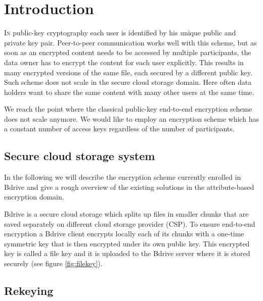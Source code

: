\section{Introduction}
\label{sec:introduction}
\lettrine[nindent=0em,lines=3]{I}n public-key cryptography each user is identified by his unique public and private key pair. Peer-to-peer communication works well with this scheme, but as soon as an encrypted content needs to be accessed by multiple participants, the data owner has to encrypt the content for each user explicitly. This results in many encrypted versions of the same  file, each secured by a different public key. Such scheme does not scale in the secure cloud storage domain. Here often data holders want to share the same content with many other users at the same time.

We reach the point where the classical public-key end-to-end encryption scheme does not scale anymore. We would like to employ an encryption scheme which has a constant number of access keys regardless of the number of participants.

\subsection{Secure cloud storage system}
In the following we will describe the encryption scheme currently enrolled in Bdrive and give a rough overview of the existing solutions in the attribute-based encryption domain.

Bdrive is a secure cloud storage which splits up files in smaller chunks that are saved separately on different cloud storage provider (\ac{CSP}). To ensure end-to-end encryption a Bdrive client encrypts locally each of its chunks with a one-time symmetric key that is then encrypted under its own public key. This encrypted key is called a file key and it is uploaded to the Bdrive server where it is stored securely (see figure \ref{fig:filekey}).

\subsection{Rekeying}
